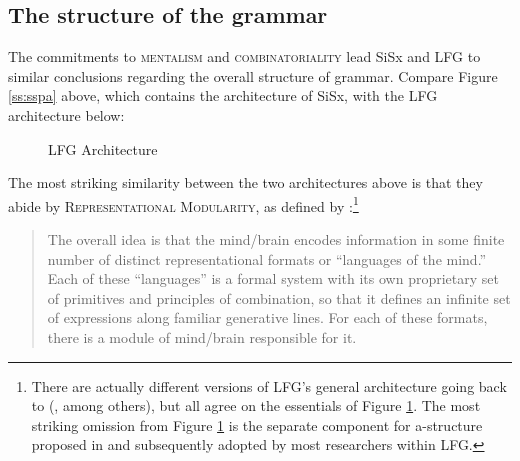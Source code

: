 \documentclass[output=paper,hidelinks]{langscibook}
\begin{document}

\subsection{The structure of the grammar}

The commitments to \textsc{mentalism} and \textsc{combinatoriality} lead SiSx and LFG to similar conclusions regarding the overall structure of grammar. Compare Figure \ref{ss:sspa} above, which contains the architecture of SiSx, with the LFG architecture below:


\begin{figure}
\begin{center}
\caption{LFG Architecture}
\label{ss:lfgpa}
\end{center}
\end{figure}


The most striking similarity between the two architectures above is that they abide by \textsc{Representational Modularity}, as defined by \citet{jackendoff1997the-architecture}:\footnote{There are actually different versions of LFG's general architecture going back to \citet{kaplan1987three} (\citealt{asudeh2006direct, findlay2017mapping, dalrymple2019lexical}, among others), but all agree on the essentials of Figure \ref{ss:lfgpa}. The most striking omission from Figure \ref{ss:lfgpa} is the separate component for a-structure proposed in \citet{butt1997architecture} and subsequently adopted by most researchers within LFG.}

\begin{quote}
The overall idea is that the mind/brain encodes information in some finite number of distinct representational formats or ``languages of the mind.'' Each of these ``languages'' is a formal system with its own proprietary set of primitives and principles of combination, so that it defines an infinite set of expressions along familiar generative lines. For each of these formats, there is a module of mind/brain responsible for it. \citep[41]{jackendoff1997the-architecture}
\end{quote}
\end{document}
